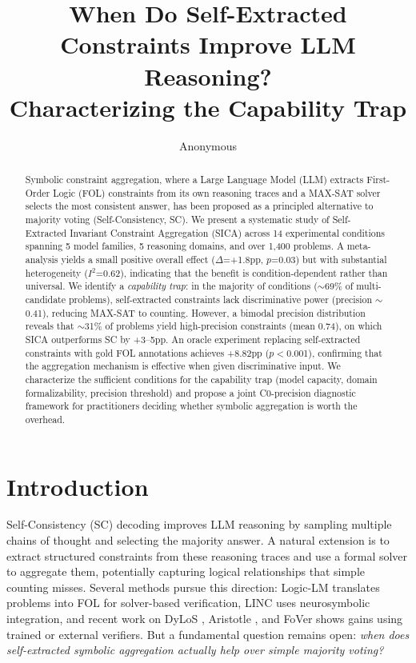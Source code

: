 \documentclass[11pt,a4paper]{article}
\title{When Do Self-Extracted Constraints Improve LLM Reasoning? \\ Characterizing the Capability Trap}
\author{Anonymous}
\date{}
\begin{document}
\maketitle

\begin{abstract}
Symbolic constraint aggregation, where a Large Language Model (LLM) extracts First-Order Logic (FOL) constraints from its own reasoning traces and a MAX-SAT solver selects the most consistent answer, has been proposed as a principled alternative to majority voting (Self-Consistency, SC). We present a systematic study of Self-Extracted Invariant Constraint Aggregation (SICA) across 14 experimental conditions spanning 5 model families, 5 reasoning domains, and over 1,400 problems. A meta-analysis yields a small positive overall effect ($\Delta$=+1.8pp, $p$=0.03) but with substantial heterogeneity ($I^2$=0.62), indicating that the benefit is condition-dependent rather than universal. We identify a \emph{capability trap}: in the majority of conditions ($\sim$69\% of multi-candidate problems), self-extracted constraints lack discriminative power (precision $\sim$0.41), reducing MAX-SAT to counting. However, a bimodal precision distribution reveals that $\sim$31\% of problems yield high-precision constraints (mean 0.74), on which SICA outperforms SC by +3--5pp. An oracle experiment replacing self-extracted constraints with gold FOL annotations achieves +8.82pp ($p<$0.001), confirming that the aggregation mechanism is effective when given discriminative input. We characterize the sufficient conditions for the capability trap (model capacity, domain formalizability, precision threshold) and propose a joint C0-precision diagnostic framework for practitioners deciding whether symbolic aggregation is worth the overhead.
\end{abstract}

\section{Introduction}

Self-Consistency (SC) decoding \citep{wang2023selfconsistency} improves LLM reasoning by sampling multiple chains of thought and selecting the majority answer. A natural extension is to extract structured constraints from these reasoning traces and use a formal solver to aggregate them, potentially capturing logical relationships that simple counting misses. Several methods pursue this direction: Logic-LM \citep{pan2023logiclm} translates problems into FOL for solver-based verification, LINC \citep{olausson2023linc} uses neurosymbolic integration, and recent work on DyLoS \citep{dylos2026}, Aristotle \citep{aristotle2025}, and FoVer \citep{fover2025} shows gains using trained or external verifiers. But a fundamental question remains open: \emph{when does self-extracted symbolic aggregation actually help over simple majority voting?}
\end{document}
